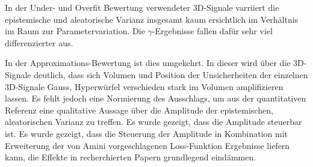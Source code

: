 
In der Under- und Overfit Bewertung verwendeter 3D-Signale varriiert die epistemische und aleatorische Varianz insgesamt kaum ersichtlich im Verhältnis im Raum zur Parametervariation. Die $\gamma$-Ergebnisse fallen dafür sehr viel differenzierter aus. 

In der Approximations-Bewertung ist dies umgekehrt. In dieser wird über die 3D-Signale deutlich, dass sich Volumen und Position der Unsicherheiten der einzelnen 3D-Signale Gauss, Hyperwürfel verschieden stark im Volumen amplifizieren lassen. Es fehlt jedoch eine Normierung des Ausschlags, um aus der quantitativen Referenz eine qualitative Aussage über die Amplitude der epistemischen, aleatorischen Varianz zu treffen. Es wurde gezeigt, dass die Amplitude steuerbar ist. Es wurde gezeigt, dass die Steuerung der Amplitude in Kombination mit Erweiterung der von Amini vorgeschlagenen  Loss-Funktion Ergebnisse liefern kann, die Effekte in recherchierten Papern grundlegend eindämmen.